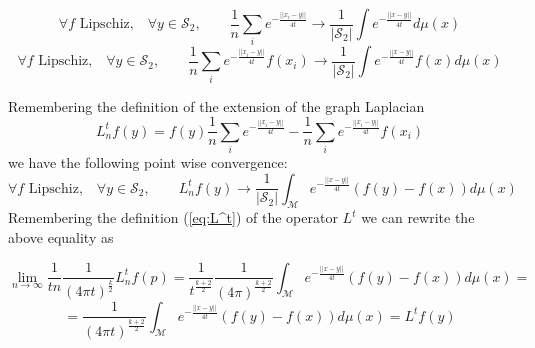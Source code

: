 $$\forall f \text{ Lipschiz,}\quad \forall y\in\mathcal S_2,  \quad\quad \frac{1}{n}\sum_i e^{-\frac{||x_i-y||}{4t}}\rightarrow \frac{1}{|\mathcal S_2|}\int e^{-\frac{||x-y||}{4t}}d\mu(x)$$
$$\forall f \text{ Lipschiz,}\quad \forall y\in\mathcal S_2,  \quad\quad \frac{1}{n}\sum_i e^{-\frac{||x_i-y||}{4t}}f(x_i)\rightarrow \frac{1}{|\mathcal S_2|}\int e^{-\frac{||x-y||}{4t}}f(x)d\mu(x)$$

Remembering the definition of the extension of the graph Laplacian
$$L_n^tf(y)=f(y) \frac{1}{n}\sum_i e^{-\frac{||x_i-y||}{4t}}-\frac{1}{n}\sum_ie^{-\frac{||x_i-y||}{4t}}f(x_i)$$
 we have the following point wise convergence:
$$\forall f \text{ Lipschiz,}\quad \forall y\in\mathcal S_2,  \quad\quad L_n^tf(y)\rightarrow \frac{1}{|\mathcal S_2|}\int_\mathcal M e^{-\frac{||x-y||}{4t}}\left(f(y)-f(x)\right)d\mu(x)$$
Remembering the definition (\ref{eq:L^t}) of the operator $L^t$ we can rewrite the above equality as

$$\lim_{n\to\infty}\frac{1}{tn}\frac{1}{ (4\pi t)^{\frac{k}{2}}}L_n^tf(p)= \frac{1}{t^{\frac{k+2}{2}}}\frac{1}{ (4\pi)^{\frac{k+2}{2}}}\int_\mathcal M e^{-\frac{||x-y||}{4t}}\left(f(y)-f(x)\right)d\mu(x)=$$
$$= \frac{1}{ (4\pi t)^{\frac{k+2}{2}}}\int_\mathcal M e^{-\frac{||x-y||}{4t}}\left(f(y)-f(x)\right)d\mu(x) = L^tf(y)$$